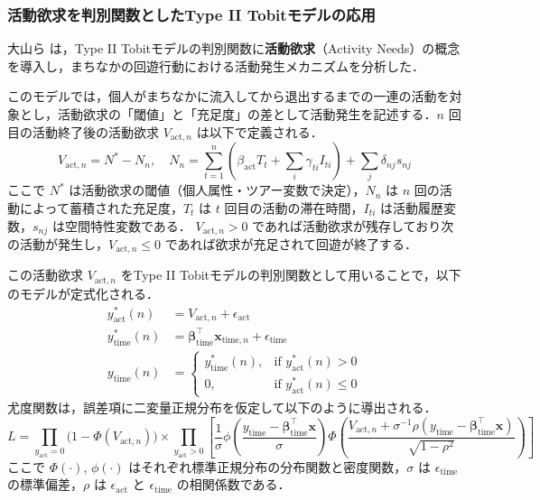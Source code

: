 \subsubsection{活動欲求を判別関数としたType II Tobitモデルの応用}\label{sssec:tobit_activity_needs}

大山ら \cite{OyamaFukuyamaHato2014} は，Type II Tobitモデルの判別関数に\textbf{活動欲求}（Activity Needs）の概念を導入し，まちなかの回遊行動における活動発生メカニズムを分析した．

このモデルでは，個人がまちなかに流入してから退出するまでの一連の活動を対象とし，活動欲求の「閾値」と「充足度」の差として活動発生を記述する．$n$ 回目の活動終了後の活動欲求 $V_{\mathrm{act}, n}$ は以下で定義される．
\begin{equation}\label{eq:activity_needs}
  V_{\mathrm{act}, n} = N^* - N_n, \quad
  N_n = \sum_{t=1}^{n} \left( \beta_{\mathrm{act}} T_t + \sum_i \gamma_{ti} I_{ti} \right) + \sum_j \delta_{nj} s_{nj}
\end{equation}
ここで $N^*$ は活動欲求の閾値（個人属性・ツアー変数で決定），$N_n$ は $n$ 回の活動によって蓄積された充足度，$T_t$ は $t$ 回目の活動の滞在時間，$I_{ti}$ は活動履歴変数，$s_{nj}$ は空間特性変数である．
$V_{\mathrm{act}, n} > 0$ であれば活動欲求が残存しており次の活動が発生し，$V_{\mathrm{act}, n} \leq 0$ であれば欲求が充足されて回遊が終了する．

この活動欲求 $V_{\mathrm{act}, n}$ をType II Tobitモデルの判別関数として用いることで，以下のモデルが定式化される．
\begin{align}
  y^*_{\mathrm{act}}(n) &= V_{\mathrm{act}, n} + \epsilon_{\mathrm{act}} \label{eq:tobit2_needs_disc}\\
  y^*_{\mathrm{time}}(n) &= \bm{\beta}_{\mathrm{time}}^\top \bm{x}_{\mathrm{time}, n} + \epsilon_{\mathrm{time}} \label{eq:tobit2_needs_cont}\\
  y_{\mathrm{time}}(n) &= \begin{cases} y^*_{\mathrm{time}}(n), & \text{if } y^*_{\mathrm{act}}(n) > 0 \\ 0, & \text{if } y^*_{\mathrm{act}}(n) \leq 0 \end{cases} \label{eq:tobit2_needs_obs}
\end{align}
尤度関数は，誤差項に二変量正規分布を仮定して以下のように導出される．
\begin{equation}\label{eq:tobit2_likelihood}
  L = \prod_{y_{\mathrm{act}}=0} \bigl(1 - \Phi(V_{\mathrm{act},n})\bigr)
  \times \prod_{y_{\mathrm{act}}>0} \left[ \frac{1}{\sigma} \phi\!\left(\frac{y_{\mathrm{time}} - \bm{\beta}_{\mathrm{time}}^\top \bm{x}}{\ \sigma\ }\right) \Phi\!\left(\frac{V_{\mathrm{act},n} + \sigma^{-1}\rho(y_{\mathrm{time}} - \bm{\beta}_{\mathrm{time}}^\top \bm{x})}{\sqrt{1-\rho^2}}\right) \right]
\end{equation}
ここで $\Phi(\cdot)$, $\phi(\cdot)$ はそれぞれ標準正規分布の分布関数と密度関数，$\sigma$ は $\epsilon_{\mathrm{time}}$ の標準偏差，$\rho$ は $\epsilon_{\mathrm{act}}$ と $\epsilon_{\mathrm{time}}$ の相関係数である．

